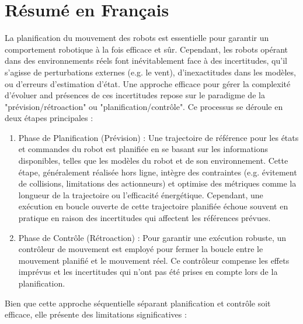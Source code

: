 \chapter{Résumé en Français}
\label{app:fr_small}

La planification du mouvement des robots est essentielle pour garantir un comportement robotique à la fois efficace et sûr.
Cependant, les robots opérant dans des environnements réels font inévitablement face à des incertitudes, qu'il s'agisse de perturbations externes (e.g. le vent), d'inexactitudes dans les modèles, ou d'erreurs d'estimation d'état.
Une approche efficace pour gérer la complexité d'évoluer and présences de ces incertitudes repose sur le paradigme de la "prévision/rétroaction" ou "planification/contrôle". 
Ce processus se déroule en deux étapes principales :
\begin{enumerate}
    \item Phase de Planification (Prévision) : Une trajectoire de référence pour les états et commandes du robot est planifiée en se basant sur les informations disponibles, telles que les modèles du robot et de son environnement. 
    Cette étape, généralement réalisée hors ligne, intègre des contraintes (e.g. évitement de collisions, limitations des actionneurs) et optimise des métriques comme la longueur de la trajectoire ou l'efficacité énergétique. 
    Cependant, une exécution en boucle ouverte de cette trajectoire planifiée échoue souvent en pratique en raison des incertitudes qui affectent les références prévues.
    \item Phase de Contrôle (Rétroaction) : Pour garantir une exécution robuste, un contrôleur de mouvement est employé pour fermer la boucle entre le mouvement planifié et le mouvement réel. 
    Ce contrôleur compense les effets imprévus et les incertitudes qui n'ont pas été prises en compte lors de la planification.
\end{enumerate} 

Bien que cette approche séquentielle séparant planification et contrôle soit efficace, elle présente des limitations significatives :

